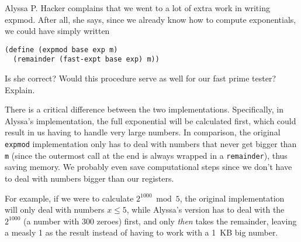 \documentclass{../../sicp}
\date{August 26, 2024}
\begin{document}
\maketitle

\begin{displayquote}
	Alyssa P. Hacker complains that we went to a lot of extra work in writing expmod. After all, she says, since we already know how to compute exponentials, we could have simply written
	\begin{lstlisting}
(define (expmod base exp m)
  (remainder (fast-expt base exp) m))
\end{lstlisting}
	Is she correct? Would this procedure serve as well for our fast prime tester? Explain.
\end{displayquote}

There is a critical difference between the two implementations.
Specifically, in Alyssa's implementation, the full exponential will be calculated first, which could result in us having to handle very large numbers.
In comparison, the original \texttt{expmod} implementation only has to deal with numbers that never get bigger than \texttt{m} (since the outermost call at the end is always wrapped in a \texttt{remainder}), thus saving memory.
We probably even save computational steps since we don't have to deal with numbers bigger than our registers.

For example, if we were to calculate $2^{1000} \bmod 5$, the original implementation will only deal with numbers $x \leq 5$, while Alyssa's version has to deal with the $2^{1000}$ (a number with 300 zeroes) first, and only \emph{then} takes the remainder, leaving a measly 1 as the result instead of having to work with a 1~KB big number.
\end{document}
